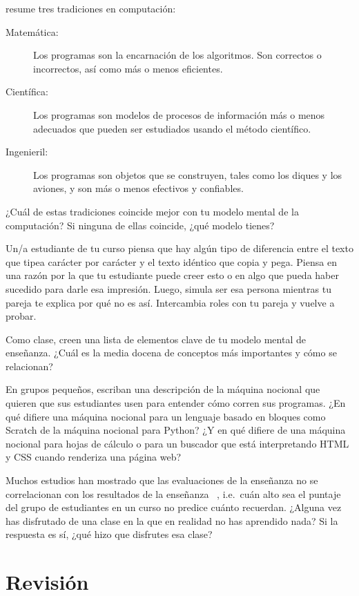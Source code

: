 
\cite{Tedr2008} resume tres tradiciones en computación:

\begin{description}

\item[Matemática:]
  Los programas son la encarnación de los algoritmos. 
Son correctos o incorrectos, así como más o menos eficientes. 

\item[Científica:]
Los programas son modelos de procesos de información más o menos adecuados
que pueden ser estudiados usando el método científico.

\item[Ingenieril:]
Los programas son objetos que se construyen, tales como los diques y los aviones,
y son más o menos efectivos y confiables.

\end{description}
¿Cuál de estas tradiciones coincide mejor con tu modelo mental de la computación?
Si ninguna de ellas coincide, ¿qué modelo tienes?

Un/a estudiante de tu curso piensa que hay algún tipo de diferencia entre el texto
que tipea carácter por carácter y el texto idéntico que copia y pega.
Piensa en una razón por la que tu estudiante puede creer esto
o en algo que pueda haber sucedido para darle esa impresión.
Luego, simula ser esa persona mientras tu pareja te explica por qué no es así.
Intercambia roles con tu pareja y vuelve a probar.


Como clase,
creen una lista de elementos clave de tu modelo mental de enseñanza.
¿Cuál es la media docena de conceptos más importantes y cómo se relacionan?


En grupos pequeños,
escriban una descripción de la máquina nocional que quieren que sus estudiantes usen para entender cómo corren sus programas.
¿En qué difiere una máquina nocional para un lenguaje basado en bloques como Scratch de la máquina nocional para Python?
¿Y en qué difiere de una máquina nocional para hojas de cálculo o para un buscador que está interpretando HTML y CSS cuando renderiza una página web?

Muchos estudios han mostrado que
las evaluaciones de la enseñanza no se correlacionan con los resultados de la enseñanza ~\cite{Star2014,Uttl2017},
i.e.\ cuán alto sea el puntaje del grupo de estudiantes en un curso no predice cuánto recuerdan.
¿Alguna vez has disfrutado de una clase en la que en realidad no has aprendido nada?
Si la respuesta es sí, ¿qué hizo que disfrutes esa clase?

\newpage
\section*{Revisión}


